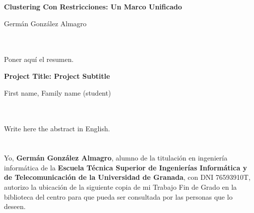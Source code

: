 

\cleardoublepage



\begin{center}
{\large\bfseries  Clustering Con Restricciones: Un Marco Unificado}\\
\end{center}
\begin{center}
Germán González Almagro\\
\end{center}

\\

\vspace{0.7cm}
\\

Poner aquí el resumen.
\cleardoublepage


\thispagestyle{empty}


\begin{center}
{\large\bfseries Project Title: Project Subtitle}\\
\end{center}
\begin{center}
First name, Family name (student)\\
\end{center}

\vspace{0.7cm}
\\

\vspace{0.7cm}
\\

Write here the abstract in English.

\chapter*{}
\thispagestyle{empty}


Yo, \textbf{Germán González Almagro}, alumno de la titulación en ingeniería informática de la \textbf{Escuela Técnica Superior
de Ingenierías Informática y de Telecomunicación de la Universidad de Granada}, con DNI 76593910T, autorizo la
ubicación de la siguiente copia de mi Trabajo Fin de Grado en la biblioteca del centro para que pueda ser
consultada por las personas que lo deseen.

